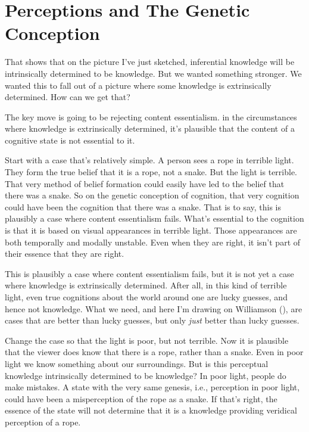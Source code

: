 \documentclass[
  11pt,
  letterpaper,
  DIV=11,
  numbers=noendperiod,
  twoside]{scrartcl}
\begin{document}
\section{Perceptions and The Genetic Conception}\label{sec-perception}

That shows that on the picture I've just sketched, inferential knowledge
will be intrinsically determined to be knowledge. But we wanted
something stronger. We wanted this to fall out of a picture where some
knowledge is extrinsically determined. How can we get that?

The key move is going to be rejecting content essentialism. in the
circumstances where knowledge is extrinsically determined, it's
plausible that the content of a cognitive state is not essential to it.

Start with a case that's relatively simple. A person sees a rope in
terrible light. They form the true belief that it is a rope, not a
snake. But the light is terrible. That very method of belief formation
could easily have led to the belief that there was a snake. So on the
genetic conception of cognition, that very cognition could have been the
cognition that there was a snake. That is to say, this is plausibly a
case where content essentialism fails. What's essential to the cognition
is that it is based on visual appearances in terrible light. Those
appearances are both temporally and modally unstable. Even when they are
right, it isn't part of their essence that they are right.

This is plausibly a case where content essentialism fails, but it is not
yet a case where knowledge is extrinsically determined. After all, in
this kind of terrible light, even true cognitions about the world around
one are lucky guesses, and hence not knowledge. What we need, and here
I'm drawing on Williamson (), are
cases that are better than lucky guesses, but only \emph{just} better
than lucky guesses.

Change the case so that the light is poor, but not terrible. Now it is
plausible that the viewer does know that there is a rope, rather than a
snake. Even in poor light we know something about our surroundings. But
is this perceptual knowledge intrinsically determined to be knowledge?
In poor light, people do make mistakes. A state with the very same
genesis, i.e., perception in poor light, could have been a misperception
of the rope as a snake. If that's right, the essence of the state will
not determine that it is a knowledge providing veridical perception of a
rope.
\end{document}
